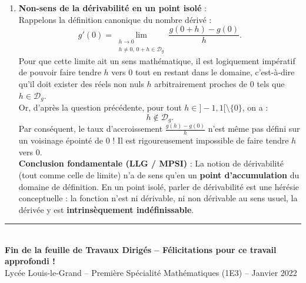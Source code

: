 \documentclass[11pt,a4paper]{article}
\begin{document}
\begin{correctionbox}
\begin{enumerate}[label=\textbf{\arabic*.}]
\begin{enumerate}[label=\alph*.]
        \item \textbf{Non-sens de la dérivabilité en un point isolé} :\\
        Rappelons la définition canonique du nombre dérivé :
        \[
        g'(0) = \lim_{\substack{h \to 0 \\ h \neq 0, \, 0+h \in \mathcal{D}_g}} \frac{g(0+h) - g(0)}{h}.
        \]
        Pour que cette limite ait un sens mathématique, il est logiquement impératif de pouvoir faire tendre $h$ vers $0$ tout en restant dans le domaine, c'est-à-dire qu'il doit exister des réels non nuls $h$ arbitrairement proches de $0$ tels que $h \in \mathcal{D}_g$.\\
        Or, d'après la question précédente, pour tout $h \in ]-1, 1[ \setminus \{0\}$, on a :
        \[
        h \notin \mathcal{D}_g.
        \]
        Par conséquent, le taux d'accroissement $\frac{g(h) - g(0)}{h}$ n'est même pas défini sur un voisinage épointé de $0$ !
        Il est rigoureusement impossible de faire tendre $h$ vers $0$.\\
        \textbf{Conclusion fondamentale (LLG / MPSI)} : La notion de dérivabilité (tout comme celle de limite) n'a de sens qu'en un \textbf{point d'accumulation} du domaine de définition. En un point isolé, parler de dérivabilité est une hérésie conceptuelle : la fonction n'est ni dérivable, ni non dérivable au sens usuel, la dérivée y est \textbf{intrinsèquement indéfinissable}.
    \end{enumerate}
\end{enumerate}
\end{correctionbox}

\vspace{1cm}
\begin{center}
    \rule{0.5\textwidth}{0.8pt}\\[0.3cm]
    {\small \textbf{Fin de la feuille de Travaux Dirigés -- Félicitations pour ce travail approfondi !}}\\[0.15cm]
    {\footnotesize Lycée Louis-le-Grand -- Première Spécialité Mathématiques (1E3) -- Janvier 2022}
\end{center}
\end{document}

